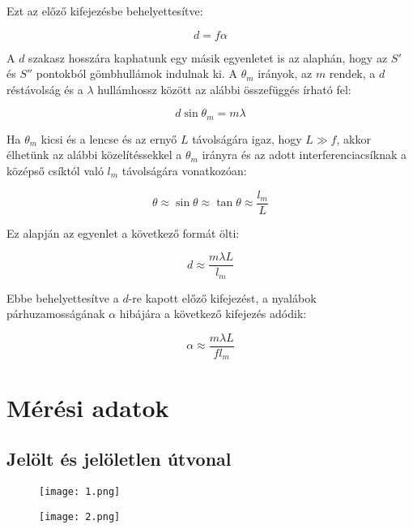 \documentclass[12pt,a4paper]{article}
\begin{document}
Ezt az előző kifejezésbe behelyettesítve:

\begin{equation*}
    d=f\alpha
\end{equation*}

A $d$ szakasz hosszára kaphatunk egy másik egyenletet is az alaphán, hogy az $S'$ és $S''$ pontokból gömbhullámok indulnak ki. A $\theta_m$ irányok, az $m$ rendek, a $d$ réstávolság és a $\lambda$ hullámhossz között az alábbi összefüggés írható fel:

\begin{equation}
d\sin\theta_m=m\lambda
\end{equation}

Ha $\theta_m$ kicsi és a lencse és az ernyő $L$ távolságára igaz, hogy $L\gg f$, akkor élhetünk az alábbi közelítéssekkel a $\theta_m$ irányra és az adott interferenciacsíknak a középső csíktól való $l_m$ távolságára vonatkozóan:

\begin{equation*}
\theta \approx \sin\theta\approx\tan\theta\approx\frac{l_m}{L}
\end{equation*}

Ez alapján az egyenlet a következő formát ölti:

\begin{equation*}
d \approx \frac{m\lambda L}{l_m}     
\end{equation*}

Ebbe behelyettesítve a $d$-re kapott előző kifejezést, a nyalábok párhuzamosságának $\alpha$ hibájára a következő kifejezés adódik: 

\begin{equation}\label{eq: alpha}
\alpha\approx  \frac{m\lambda L}{fl_m}
\end{equation}

\section{Mérési adatok}

\subsection{Jelölt és jelöletlen útvonal}

\begin{figure}[h]
\centering
\begin{minipage}{.5\textwidth}
  \centering
  \texttt{[image: 1.png]}
  \label{fig:test1}
\end{minipage}%
\begin{minipage}{.5\textwidth}
  \centering
  \texttt{[image: 2.png]}
  \label{fig:test2}
\end{minipage}
\end{figure}
\end{document}
